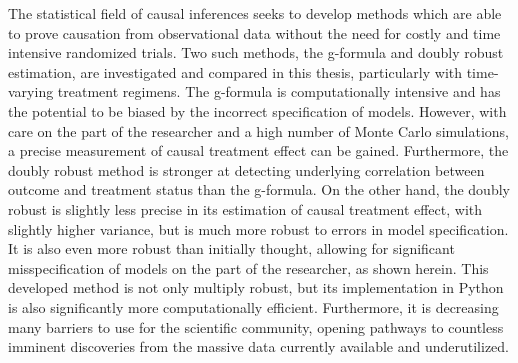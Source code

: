 
The statistical field of causal inferences seeks to develop methods which are able to prove causation from observational data without the need for costly and time intensive randomized trials.  Two such methods, the g-formula and doubly robust estimation, are investigated and compared in this thesis, particularly with time-varying treatment regimens.  The g-formula is computationally intensive and has the potential to be biased by the incorrect specification of models.  However, with care on the part of the researcher and a high number of Monte Carlo simulations, a precise measurement of causal treatment effect can be gained.  Furthermore, the doubly robust method is stronger at detecting underlying correlation between outcome and treatment status than the g-formula.  On the other hand, the doubly robust is slightly less precise in its estimation of causal treatment effect, with slightly higher variance, but is much more robust to errors in model specification.  It is also even more robust than initially thought, allowing for significant misspecification of models on the part of the researcher, as shown herein.   This developed method is not only multiply robust, but its implementation in Python is also significantly more computationally efficient.  Furthermore, it is decreasing many barriers to use for the scientific community, opening pathways to countless imminent discoveries from the massive data currently available and underutilized.  